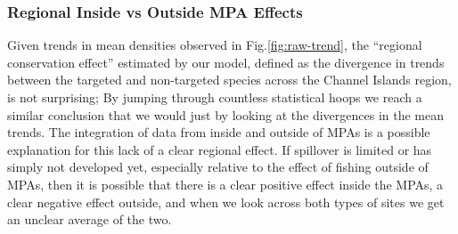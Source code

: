 \documentclass[twoside,12pt,final]{ucthesis-CA2012}
\begin{document}
\begin{ucmainmatter}
\subsubsection{Regional Inside vs Outside MPA
Effects}\label{regional-inside-vs-outside-mpa-effects}

Given trends in mean densities observed in Fig.\ref{fig:raw-trend}, the
``regional conservation effect'' estimated by our model, defined as the
divergence in trends between the targeted and non-targeted species
across the Channel Islands region, is not surprising; By jumping through
countless statistical hoops we reach a similar conclusion that we would
just by looking at the divergences in the mean trends. The integration
of data from inside and outside of MPAs is a possible explanation for
this lack of a clear regional effect. If spillover is limited or has
simply not developed yet, especially relative to the effect of fishing
outside of MPAs, then it is possible that there is a clear positive
effect inside the MPAs, a clear negative effect outside, and when we
look across both types of sites we get an unclear average of the two.


\end{ucmainmatter}
\end{document}
